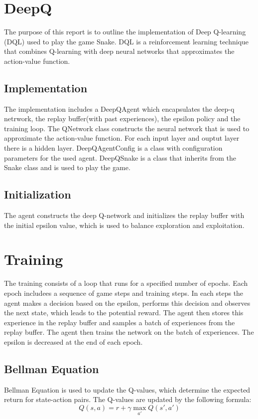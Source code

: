 \section{DeepQ}
\label{sec:deepq}
The purpose of this report is to outline the implementation of Deep Q-learning (DQL) used to play the game Snake. DQL is a reinforcement learning technique that combines Q-learning with deep neural networks that approximates the action-value function.

\subsection{Implementation}
The implementation includes a DeepQAgent which encapsulates the deep-q netrwork, the replay buffer(with past experiences), the epsilon policy and the training loop.
The QNetwork class constructs the neural network that is used to approximate the action-value function.
For each input layer and ouptut layer there is a hidden layer.
DeepQAgentConfig is a class with configuration parameters for the used agent.
DeepQSnake is a class that inherits from the Snake class and is used to play the game.

\subsection{Initialization}
The agent constructs the deep Q-network and initializes the replay buffer with the initial epsilon value, which is used to balance exploration and exploitation.

\section{Training}
The training consists of a loop that runs for a specified number of epochs. Each epoch includees a sequence of game steps and training steps. In each steps the agent makes a decision based on the epsilon, performs this decision and observes the next state, which leads to the potential reward. The agent then stores this experience in the replay buffer and samples a batch of experiences from the replay buffer. The agent then trains the network on the batch of experiences.
The epsilon is decreased at the end of each epoch.

\subsection{Bellman Equation}
Bellman Equation is used to update the Q-values, which determine the expected return for state-action pairs. The Q-values are updated by the following formula: 
\[
Q(s, a) = r + \gamma \max_{a'} Q(s', a')
\]

